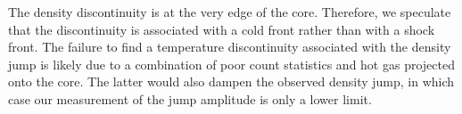 The density discontinuity is at the very edge of the core. Therefore, we speculate that the discontinuity is associated with a cold front rather than with a shock front. The failure to find a temperature discontinuity associated with the density jump is likely due to a combination of poor count statistics and hot gas projected onto the core. The latter would also dampen the observed density jump, in which case our measurement of the jump amplitude is only a lower limit.  


